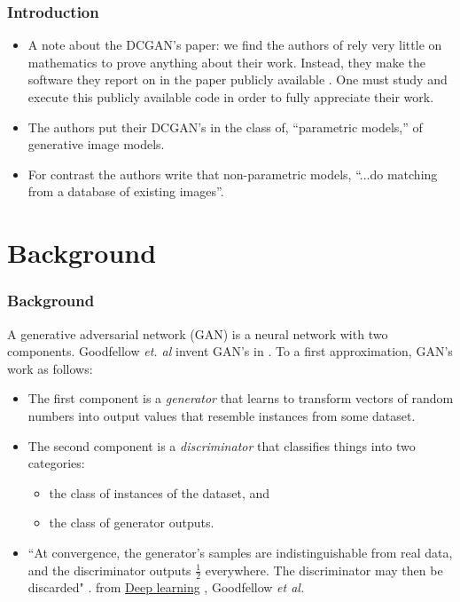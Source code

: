 \documentclass{beamer}
\begin{document}

\begin{frame}
\frametitle{Introduction}
\begin{itemize}

\item A note about the DCGAN's paper: we find the authors of \cite{repLearnDcgan} rely
  very little on mathematics to prove anything about their work.  Instead, they
  make the software they report on in the paper publicly available \cite{dcganCode}.
  One must study and execute this publicly available code in order to fully appreciate
  their work.

\item The authors put their DCGAN's in the class of, ``parametric models,'' of
  generative image models.

\item For contrast the authors write that non-parametric models, ``...do
  matching  from a database of existing images''.

\end{itemize}

\end{frame}



\section{Background} 
\begin{frame}
\frametitle{Background}
A generative adversarial network (GAN) is a neural network with two components. 
Goodfellow \textit{et. al} invent GAN's in \cite{gan}. To a first approximation,
GAN's work as follows:
\begin{itemize}
  \item The first component is a \textit{generator} that learns to transform vectors 
    of random numbers into output values that resemble instances from some dataset.  
  \item The second component is a \textit{discriminator} that classifies things into 
  two categories:
  \begin{itemize}
    \item the class of instances of the dataset, and
    \item the class of generator outputs.
  \end{itemize}
  \item ``At convergence, the generator’s samples are indistinguishable from real data,
     and the discriminator outputs $\frac{1}{2}$ everywhere. The discriminator may 
     then be discarded" \cite{deepLearnBookGenCh}. from \underline{Deep learning} , 
     Goodfellow \textit{et al.} 
\end{itemize}
\end{frame}
\end{document}
